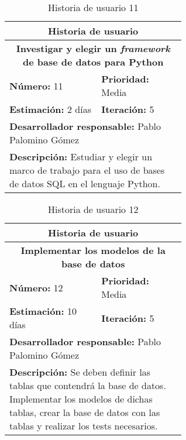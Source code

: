 \begin{table}[H]
        \centering
        \begin{tabular}{|p{0.3\linewidth}|p{0.3\linewidth}|}
          \hline
          \multicolumn{2}{|c|}{Historia de usuario}\\ \hline
          \multicolumn{2}{|c|}{\textbf{Investigar y elegir un \textit{framework} de base de datos para Python}}\\ \hline
          \textbf{Número:} 11 & \textbf{Prioridad:} Media\\ \hline
          \textbf{Estimación:} 2 días & \textbf{Iteración:} 5\\ \hline
          \multicolumn{2}{|l|}{\textbf{Desarrollador responsable:} Pablo Palomino Gómez}\\ \hline
          \multicolumn{2}{|p{0.6\linewidth}|}{\textbf{Descripción:} Estudiar y elegir un marco de trabajo para el uso de bases de datos SQL en el lenguaje Python.}\\ \hline
        \end{tabular}
        \caption{Historia de usuario 11}
        \label{tab:hist11}
\end{table}
\begin{table}[H]
        \centering
        \begin{tabular}{|p{0.3\linewidth}|p{0.3\linewidth}|}
          \hline
          \multicolumn{2}{|c|}{Historia de usuario}\\ \hline
          \multicolumn{2}{|c|}{\textbf{Implementar los modelos de la base de datos}}\\ \hline
          \textbf{Número:} 12 & \textbf{Prioridad:} Media\\ \hline
          \textbf{Estimación:} 10 días & \textbf{Iteración:} 5\\ \hline
          \multicolumn{2}{|l|}{\textbf{Desarrollador responsable:} Pablo Palomino Gómez}\\ \hline
          \multicolumn{2}{|p{0.6\linewidth}|}{\textbf{Descripción:} Se deben definir las tablas que contendrá la base de datos. Implementar los modelos de dichas tablas, crear la base de datos con las tablas y realizar los tests necesarios.}\\ \hline
        \end{tabular}
        \caption{Historia de usuario 12}
        \label{tab:hist12}
\end{table}
